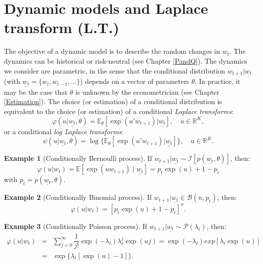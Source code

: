 \documentclass[
  12pt,
]{book}
\theoremstyle{definition}
\theoremstyle{definition}
\newtheorem{example}{Example}[chapter]
\theoremstyle{definition}
\theoremstyle{definition}
\theoremstyle{remark}
\begin{document}
\hypertarget{Dynamic}{%
\section{Dynamic models and Laplace transform (L.T.)}\label{Dynamic}}

The objective of a dynamic model is to describe the random changes in \(w_t\). The dynamics can be historical or risk-neutral (see Chapter \ref{PandQ}). The dynamics we consider are parametric, in the sense that the conditional distribution \(w_{t+1}|\underline{w_t}\) (with \(\underline{w_t}=\{w_t,w_{t-1},\dots\}\)) depends on a vector of parameters \(\theta\). In practice, it may be the case that \(\theta\) is unknown by the econometrician (see Chapter \ref{Estimation}). The choice (or estimation) of a conditional distribution is equivalent to the choice (or estimation) of a conditional \emph{Laplace transforms}:
\begin{equation}
\varphi(u|\underline{w_t},\theta) =
\mathbb{E}_{\theta}[\exp(u'w_{t+1})|\underline{w_t}], \quad u \in \mathbb{R}^K,\label{eq:LT}
\end{equation}
or a conditional \emph{log Laplace transforms}:
\[
\psi(u|\underline{w_t},\theta) =
\log\{\mathbb{E}_{\theta}[\exp(u'w_{t+1})|\underline{w_t}]\}, \quad u \in
\mathbb{R}^K.
\]

\begin{example}[Conditionally Bernoulli process]
\protect\hypertarget{exm:exBenoulli}{}\label{exm:exBenoulli}If \(w_{t+1}|\underline{w_t} \sim {\mathcal{I}} [p(\underline{w_t},\theta)]\), then:
\[
\varphi(u|w_t)=
\mathbb{E}[\exp(u w_{t+1}) \mid \underline{w_t}] = p_t \exp(u) + 1-p_t
\]
with \(p_t = p(\underline{w_t}, \theta)\).
\end{example}

\begin{example}[Conditionally Binomial process]
\protect\hypertarget{exm:exBenoulli2}{}\label{exm:exBenoulli2}If \(w_{t+1}|\underline{w_t} \in {\mathcal{B}}(n, p_t)\), then:
\[
\varphi(u|w_t)=[p_t   \exp(u) + 1-p_t]^n.
\]
\end{example}

\begin{example}[Conditionally Poisson process]
\protect\hypertarget{exm:exPoisson}{}\label{exm:exPoisson}If \(w_{t+1}|\underline{w_t} \sim {\mathcal{P}}(\lambda_t)\), then:
\begin{eqnarray*}
\varphi(u|w_t) & =&   \sum^\infty_{j=0}  \dfrac{1}{j!}  \exp(-\lambda_t) \lambda^j_t   \exp(uj)  = \exp(-\lambda_t) exp[\lambda_t \exp(u)] \\
& =& \exp\{\lambda_t[\exp(u)-1]\}.
\end{eqnarray*}
\end{example}
\end{document}
